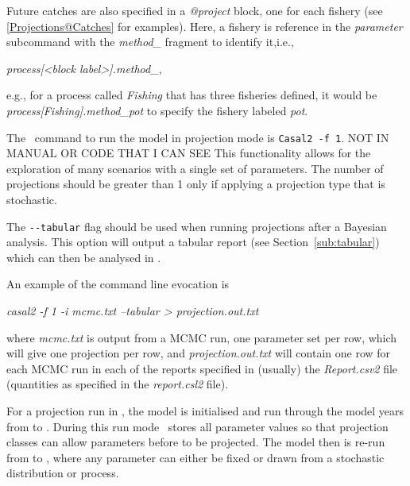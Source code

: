Future catches are also specified in a \textit{@project} block, one for each fishery (see \ref{Projections@Catches} for examples). Here, a fishery is reference in the \textit{parameter}
 subcommand with the \textit{method\_} fragment to identify it,i.e.,
 
 \textit{process[<block label>].method\_<fisheries label>},
 
 e.g., for a process called \textit{Fishing} that has three fisheries defined, it would be \textit{process[Fishing].method\_pot} to specify the fishery labeled \textit{pot}.
 
The \CNAME~command to run the model in projection mode is \texttt{Casal2 -f 1}. NOT IN MANUAL OR CODE THAT I CAN SEE This functionality allows for the exploration of many scenarios with a single set of parameters. The number of projections should be greater than 1 only if applying a projection type that is stochastic.

The \texttt{-{}-tabular} flag should be used when running projections after a Bayesian analysis. This option will output a tabular report (see Section~\ref{sub:tabular}) which can then be analysed in \R.

An example of the command line evocation is

\textit{casal2 -f 1 -i mcmc.txt --tabular > projection.out.txt}

where \textit{mcmc.txt} is output from a MCMC run, one parameter set per row, which will give one projection per row, and \textit{projection.out.txt} will contain one row for each MCMC run in each of the reports specified in (usually) the \textit{Report.csv2} file (quantities as specified in the \textit{report.csl2} file).

For a projection run in \CNAME, the model is initialised and run through the model years from  to . During this run mode \CNAME~stores all parameter values so that projection classes can allow parameters before  to be projected. The model then is re-run from  to , where any parameter can either be fixed or drawn from a stochastic distribution or process.



\subsubsection{\label{sec:projections}}

